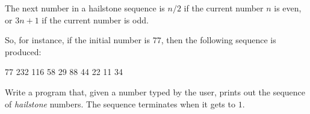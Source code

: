 The next number in a hailstone sequence is $n/2$ if the current
number $n$ is even, or $3n+1$ if the current number is odd.

So, for instance, if the initial number is $77$,
then the following sequence is produced:
\begin{terminaloutput}
77
232
116
58
29
88
44
22
11
34
\end{terminaloutput}

\begin{exercise}
Write a program that, given a number typed by the user,
prints out the sequence of {\em hailstone} numbers.
The sequence terminates when it gets to $1$.
\end{exercise}
